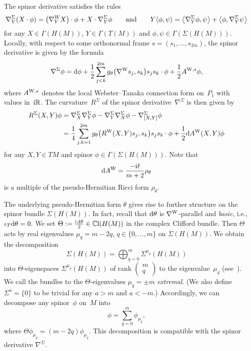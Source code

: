\documentclass[pdftex]{sigma}
\numberwithin{equation}{section}
\newcommand{\RR}{\mathbb{R}}
\newcommand{\CC}{\mathbb{C}}
\begin{document}
The spinor derivative satisfies the rules
\begin{gather*}
\nabla^\Sigma_Y (X\cdot \phi) = \big(\nabla^{\rm W}_YX\big)\cdot \phi + X\cdot \nabla^\Sigma_Y\phi\qquad \mbox{and} \qquad
Y\langle \phi,\psi\rangle = \big\langle \nabla^\Sigma_Y \phi,\psi\big\rangle + \big\langle \phi,\nabla_Y^\Sigma \psi\big\rangle
\end{gather*}
for any $X\in\Gamma(H(M))$, $Y\in\Gamma(T(M))$ and $\phi,\psi\in\Gamma(\Sigma(H(M)))$.
Locally, with respect to some orthonormal frame $s=(s_1,\dots,s_{2m})$, the spinor derivative is given by the formula
\[
\nabla^\Sigma\phi = {\rm d}\phi + \frac{1}{2}\sum_{j<k}^{2m}g_\theta\big(\nabla^{\rm W}s_j,s_k\big)s_js_k\cdot \phi + \frac{1}{2}A^{{\rm W},s} \phi,
\]
where $A^{{\rm W},s}$ denotes the local Webster--Tanaka connection form on~$P_1$ with values in~${\rm i}\RR$.
The curvature~$R^\Sigma$ of the spinor derivative~$\nabla^\Sigma$ is then given by
\begin{align*}
R^\Sigma(X,Y)\phi &= \nabla^\Sigma_X\nabla^\Sigma_Y\phi- \nabla^\Sigma_Y\nabla^\Sigma_X\phi-\nabla^\Sigma_{[X,Y]}\phi\\
&= \frac{1}{4}\sum_{j,k=1}^{2m} g_\theta\big(R^{\rm W}(X,Y)s_j,s_k\big)s_js_k\cdot \phi + \frac{1}{2}{\rm d}A^{\rm W}(X,Y)\phi
\end{align*}
for any $X,Y\in TM$ and spinor $\phi\in\Gamma(\Sigma(H(M)))$. Note that
\begin{equation}\label{curline}
{\rm d}A^{\rm W} = \frac{-{\rm i}\ell}{m+2}\rho_\theta
\end{equation}
is a multiple of the pseudo-Hermitian Ricci form $\rho_\theta$.

The underlying pseudo-Hermitian form $\theta$ gives rise to further structure on the spinor bundle $\Sigma(H(M))$.
In fact, recall that ${\rm d}\theta$ is $\nabla^{\rm W}$-parallel and {\em basic}, i.e., $\iota_T{\rm d}\theta=0$.
We set $\Theta:=\frac{{\rm i}\,{\rm d}\theta}{2}\in \CC{\rm l}(H(M))$ in the complex Clifford bundle. Then
$\Theta$ acts by real eigenvalues $\mu_q=m-2q$, $q\in\{0,\dots,m\}$ on $\Sigma(H(M))$. We obtain
the decomposition
\[
\Sigma(H(M)) = \bigoplus_{q=0}^m \Sigma^{\mu_q}(H(M))
\]
into $\Theta$-eigenspaces $\Sigma^{\mu_q}(H(M))$ of rank
$\left( \begin{smallmatrix} m\\ q\end{smallmatrix}\right)$ to the eigenvalue~$\mu_q$ (see~\cite{Pet}).
We call the bundles to the $\Theta$-eigenvalues $\mu_q=\pm m$ {\em extremal}.
(We also define $\Sigma^{a}=\{0\}$ to be trivial for any $a>m$ and $a<-m$.)
Accordingly, we can decompose any spinor~$\phi$ on~$M$
into
\[
\phi = \sum_{q=0}^m \phi_{\mu_q},
\]
where $\Theta\phi_{\mu_q}=(m-2q)\phi_{\mu_q}$. This decomposition is compatible with the spinor derivative $\nabla^\Sigma$.
\end{document}
